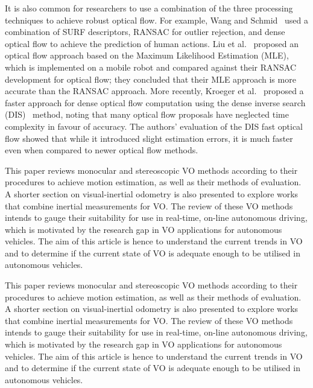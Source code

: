 
It is also common for researchers to use a combination of the three processing techniques to achieve robust optical flow. For example, Wang and Schmid~\cite{wang_action_2013} used a combination of SURF descriptors, RANSAC for outlier rejection, and dense optical flow to achieve the prediction of human actions. Liu et al.~\cite{liu_maximum_2016} proposed an optical flow approach based on the Maximum Likelihood Estimation (MLE), which is implemented on a mobile robot and compared against their RANSAC development for optical flow; they concluded that their MLE approach is more accurate than the RANSAC approach. More recently, Kroeger et al.~\cite{kroeger_fast_2016} proposed a faster approach for dense optical flow computation using the dense inverse search (DIS)~\cite {s._baker_equivalence_2001} method, noting that many optical flow proposals have neglected time complexity in favour of accuracy. The authors' evaluation of the DIS fast optical flow showed that while it introduced slight estimation errors, it is much faster even when compared to newer optical flow methods. 


This paper reviews monocular and stereoscopic VO methods according to their procedures to achieve motion estimation, as well as their methods of evaluation. A shorter section on visual-inertial odometry is also presented to explore works that combine inertial measurements for VO. The review of these VO methods intends to gauge their suitability for use in real-time, on-line autonomous driving, which is motivated by the research gap in VO applications for autonomous vehicles. The aim of this article is hence to understand the current trends in VO and to determine if the current state of VO is adequate enough to be utilised in autonomous vehicles. 

This paper reviews monocular and stereoscopic VO methods according to their procedures to achieve motion estimation, as well as their methods of evaluation. A shorter section on visual-inertial odometry is also presented to explore works that combine inertial measurements for VO. The review of these VO methods intends to gauge their suitability for use in real-time, on-line autonomous driving, which is motivated by the research gap in VO applications for autonomous vehicles. The aim of this article is hence to understand the current trends in VO and to determine if the current state of VO is adequate enough to be utilised in autonomous vehicles. 

